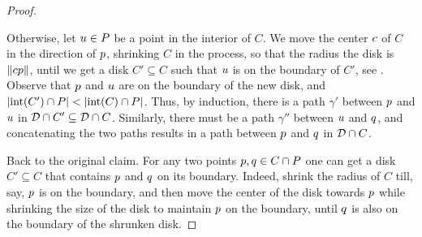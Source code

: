 \documentclass[12pt]{article}%
\begin{document}
\begin{proof}
\begin{figure}[h]
    \end{figure}
    Otherwise, let $u\in P$ be a point in the interior of
    $C$. We move the center $c$ of $C$ in the direction of
    $p$, shrinking $C$ in the process, so that the radius the
    disk is $\left\| c p \right\|$, until we get a disk
    $C' \subseteq C$ such that $u$ is on the boundary of
    $C'$, see . Observe that $p$ and $u$ are on
    the boundary of the new disk, and
    $|\interiorX{C'} \cap \PS| < |\interiorX{C} \cap
    \PS|$. Thus, by induction, there is a path $\gamma'$ between $p$
    and $u$ in
    $\mathcal{D} \cap {C'} \subseteq
    \mathcal{D} \cap {C}$. Similarly, there must be a path
    $\gamma''$ between $u$ and $q$, and concatenating the two
    paths results in a path between $p$ and $q$ in
    $\mathcal{D} \cap {C}$.

    Back to the original claim.  For any two points
    $p,q \in C \cap P$ one can get a disk $C' \subseteq C$ that
    contains $p$ and $q$ on its boundary.  Indeed, shrink the
    radius of $C$ till, say, $p$ is on the boundary, and then move
    the center of the disk towards $p$ while shrinking the size of
    the disk to maintain $p$ on the boundary, until $q$ is also on
    the boundary of the shrunken disk.
\end{proof}
\end{document}
